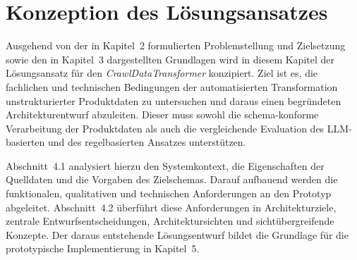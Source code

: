\section{Konzeption des Lösungsansatzes}

Ausgehend von der in Kapitel~2 formulierten Problemstellung und Zielsetzung sowie den in Kapitel~3 dargestellten Grundlagen wird in diesem Kapitel der Lösungsansatz für den 
\textit{CrawlDataTransformer} konzipiert. Ziel ist es, die fachlichen und technischen Bedingungen der automatisierten Transformation unstrukturierter Produktdaten zu untersuchen und 
daraus einen begründeten Architekturentwurf abzuleiten. Dieser muss sowohl die schema-konforme Verarbeitung der Produktdaten als auch die vergleichende Evaluation des 
LLM-basierten und des regelbasierten Ansatzes unterstützen.

Abschnitt~4.1 analysiert hierzu den Systemkontext, die Eigenschaften der Quelldaten und die Vorgaben des Zielschemas. Darauf aufbauend werden die funktionalen, qualitativen 
und technischen Anforderungen an den Prototyp abgeleitet. Abschnitt~4.2 überführt diese Anforderungen in Architekturziele, zentrale Entwurfsentscheidungen, Architektursichten 
und sichtübergreifende Konzepte. Der daraus entstehende Lösungsentwurf bildet die Grundlage für die prototypische Implementierung in Kapitel~5.



